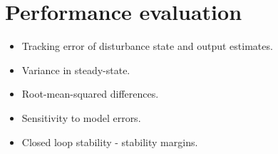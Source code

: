 \section{Performance evaluation}

\begin{itemize}
	\item Tracking error of disturbance state and output estimates.
	\item Variance in steady-state.
	\item Root-mean-squared differences.
	\item Sensitivity to model errors.
	\item Closed loop stability - stability margins.
\end{itemize}

